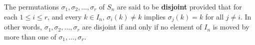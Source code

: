 \begin{definition}
The permutations $\sigma_1,\sigma_2,\ldots,\sigma_r$ of $S_n$ are said to be \textbf{disjoint} provided that for each $1 \leq i \leq r$, and every $k \in I_n$, $\sigma_i(k) \neq k$ implies $\sigma_j(k) = k$ for all $j \neq i$. In other words, $\sigma_1,\sigma_2,\ldots,\sigma_r$ are disjoint if and only if no element of $I_n$ is moved by more than one of $\sigma_1,\ldots,\sigma_r$.
\end{definition}
